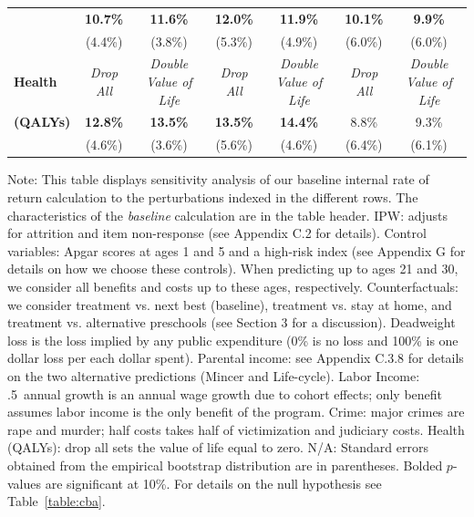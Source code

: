 \documentclass[static]{JJH-Beamer}
\begin{document}
\begin{frame}
\begin{table}[H]
\begin{center}
{\begin{tabular}{>{\bfseries}lcc|cc|cc}
	&	\textbf{10.7\%}	&	\textbf{11.6\%}	&	\textbf{12.0\%}	&	\textbf{11.9\%}	&	\textbf{10.1\%}	&	\textbf{9.9\%}	\\
	&	(4.4\%)	&	(3.8\%)	&	(5.3\%)	&	(4.9\%)	&	(6.0\%)	&	(6.0\%)	\\ \midrule
Health	&	\textit{Drop All}	&	\textit{Double Value of Life}	&	\textit{Drop All}	&	\textit{Double Value of Life}	&	\textit{Drop All}	&	\textit{Double Value of Life}	\\
(QALYs)	&	\textbf{12.8\%}	&	\textbf{13.5\%}	&	\textbf{13.5\%}	&	\textbf{14.4\%}	&	8.8\%	&	9.3\%	\\
	&	(4.6\%)	&	(3.6\%)	&	(5.6\%)	&	(4.6\%)	&	(6.4\%)	&	(6.1\%)	\\ \bottomrule
\end{tabular}
}
\end{center}
\end{table}

\end{frame}

{\flushleft \small Note: This table displays sensitivity analysis of our baseline internal rate of return calculation to the perturbations indexed in the different rows. The characteristics of the \textit{baseline} calculation are in the table header. IPW: adjusts for attrition and item non-response (see Appendix C.2 for details). Control variables: Apgar scores at ages 1 and 5 and a high-risk index (see Appendix G for details on how we choose these controls). When predicting up to ages 21 and 30, we consider all benefits and costs up to these ages, respectively. Counterfactuals: we consider treatment vs. next best (baseline), treatment vs. stay at home, and treatment vs. alternative preschools (see Section 3 for a discussion). Deadweight loss is the loss implied by any public expenditure (0\% is no loss and 100\% is one dollar loss per each dollar spent). Parental income: see Appendix C.3.8 for details on the two alternative predictions (Mincer and Life-cycle). Labor Income: .5\ annual growth is an annual wage growth due to cohort effects; only benefit assumes labor income is the only benefit of the program. Crime: major crimes are rape and murder; half costs takes half of victimization and judiciary costs. Health (QALYs): drop all sets the value of life equal to zero. N/A: Standard errors obtained from the empirical bootstrap distribution are in parentheses. Bolded $p$-values are significant at 10\%. For details on the null hypothesis see Table~\ref{table:cba}.\\}
\clearpage
\end{document}
